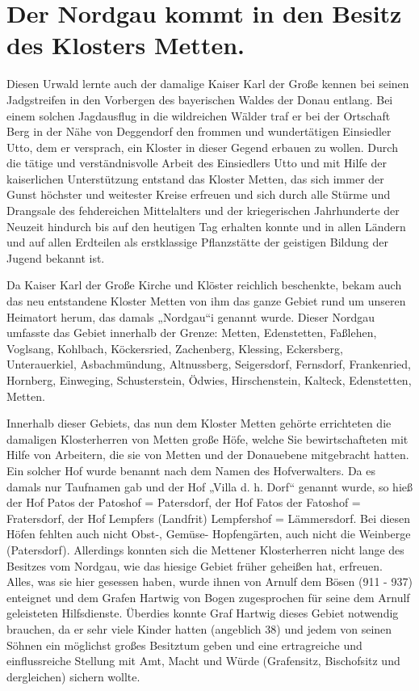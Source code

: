 \documentclass[12pt,a4pager]{book}
\begin{document}
\chapter{Der Nordgau kommt in den Besitz des Klosters Metten.}

Diesen Urwald lernte auch der damalige Kaiser Karl der Große kennen bei seinen
Jadgstreifen in den Vorbergen des bayerischen Waldes der Donau entlang. Bei
einem solchen Jagdausflug in die wildreichen Wälder traf er bei der Ortschaft
Berg in der Nähe von Deggendorf den frommen und wundertätigen Einsiedler Utto,
dem er versprach, ein Kloster in dieser Gegend erbauen zu wollen. Durch die
tätige und verständnisvolle Arbeit des Einsiedlers Utto und mit Hilfe der
kaiserlichen Unterstützung entstand das Kloster Metten, das sich immer der Gunst
höchster und weitester Kreise erfreuen und sich durch alle Stürme und Drangsale
des fehdereichen Mittelalters und der kriegerischen Jahrhunderte der Neuzeit
hindurch bis auf den heutigen Tag erhalten konnte und in allen Ländern und auf
allen Erdteilen als erstklassige Pflanzstätte der geistigen Bildung der Jugend
bekannt ist.

Da Kaiser Karl der Große Kirche und Klöster reichlich beschenkte, bekam auch das
neu entstandene Kloster Metten von ihm das ganze Gebiet rund um unseren
Heimatort herum, das damals „Nordgau“i genannt wurde. Dieser Nordgau umfasste
das Gebiet innerhalb der Grenze: Metten, Edenstetten, Faßlehen, Voglsang,
Kohlbach, Köckersried, Zachenberg, Klessing, Eckersberg, Unterauerkiel,
Asbachmündung, Altnussberg, Seigersdorf, Fernsdorf, Frankenried, Hornberg,
Einweging, Schusterstein, Ödwies, Hirschenstein, Kalteck, Edenstetten, Metten.

Innerhalb dieser Gebiets, das nun dem Kloster Metten gehörte errichteten die
damaligen Klosterherren von Metten große Höfe, welche Sie bewirtschafteten mit
Hilfe von Arbeitern, die sie von Metten und der Donauebene mitgebracht hatten.
Ein solcher Hof wurde benannt nach dem Namen des Hofverwalters. Da es damals nur
Taufnamen gab und der Hof „Villa d. h. Dorf“ genannt wurde, so hieß der Hof
Patos der Patoshof = Patersdorf, der Hof Fatos der Fatoshof = Fratersdorf, der
Hof Lempfers (Landfrit) Lempfershof = Lämmersdorf. Bei diesen Höfen fehlten auch
nicht Obst-, Gemüse- Hopfengärten, auch nicht die Weinberge (Patersdorf).
Allerdings konnten sich die Mettener Klosterherren nicht lange des Besitzes vom
Nordgau, wie das hiesige Gebiet früher geheißen hat, erfreuen. Alles, was sie
hier gesessen haben, wurde ihnen von Arnulf dem Bösen (911 - 937) enteignet und
dem Grafen Hartwig von Bogen zugesprochen für seine dem Arnulf geleisteten
Hilfsdienste. Überdies konnte Graf Hartwig dieses Gebiet notwendig brauchen, da
er sehr viele Kinder hatten (angeblich 38) und jedem von seinen Söhnen ein
möglichst großes Besitztum geben und eine ertragreiche und einflussreiche
Stellung mit Amt, Macht und Würde (Grafensitz, Bischofsitz und dergleichen)
sichern wollte.
\end{document}
